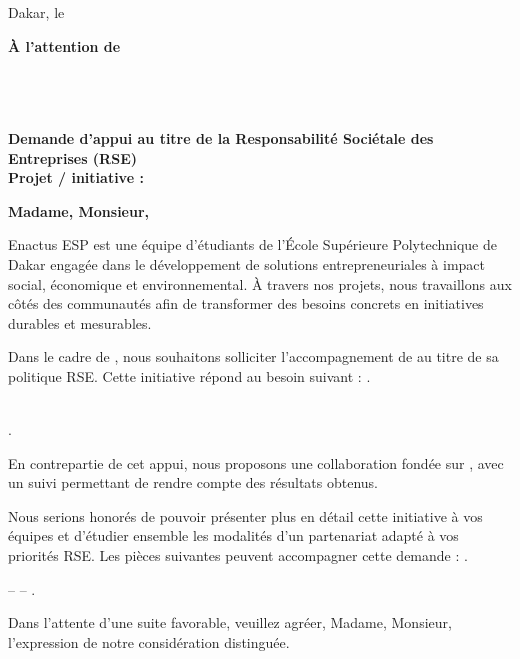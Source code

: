 \documentclass[11pt,a4paper]{article}
\begin{document}
\MakeLetterStart
\begin{flushright}Dakar, le \LetterDate\end{flushright}
\begin{flushright}
\textbf{À l'attention de \RecipientName}\\
\RecipientRole\\
\CompanyName\\
\RecipientAddress
\end{flushright}
\vspace{2mm}
 \DocReference\\
 \textbf{Demande d'appui au titre de la Responsabilité Sociétale des Entreprises (RSE)}\\
\hspace*{18mm}\textbf{Projet / initiative : \InitiativeName}
\vspace{3mm}

\textbf{Madame, Monsieur,}

\justifying
Enactus ESP est une équipe d'étudiants de l'École Supérieure Polytechnique de Dakar engagée dans le développement de solutions entrepreneuriales à impact social, économique et environnemental. À travers nos projets, nous travaillons aux côtés des communautés afin de transformer des besoins concrets en initiatives durables et mesurables.

Dans le cadre de \textbf{\InitiativeName}, nous souhaitons solliciter l'accompagnement de \textbf{\CompanyName} au titre de sa politique RSE. Cette initiative répond au besoin suivant : \ContextNeed.

 \Beneficiaries\par
{} \ImpactArea\par
{} \Sdgs\par
{} \ImplementationPeriod\par
{} \ImpactObjectives\par

\SupportRequested\\
 \SupportAmount.

En contrepartie de cet appui, nous proposons une collaboration fondée sur \PartnerValue, avec un suivi permettant de rendre compte des résultats obtenus.

Nous serions honorés de pouvoir présenter plus en détail cette initiative à vos équipes et d'étudier ensemble les modalités d'un partenariat adapté à vos priorités RSE. Les pièces suivantes peuvent accompagner cette demande : \Attachments.

 \ContactName{} -- \ContactPhone{} -- \ContactEmail.

Dans l'attente d'une suite favorable, veuillez agréer, Madame, Monsieur, l'expression de notre considération distinguée.

\SingleSignature{\SignerRole}{\SignerName}{\InstitutionEmail{} -- \ContactPhone}
\end{document}
